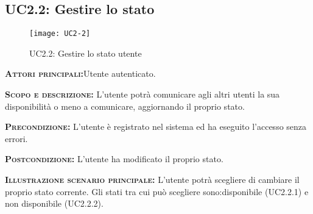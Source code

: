 \subsection{UC2.2: Gestire lo stato}
\begin{figure}[H]
\begin{center}
\texttt{[image: UC2-2]}
\caption{UC2.2: Gestire lo stato utente}\label{fig:gestione_stato}
\end{center}
\end{figure}
\begin{description}
\item{\scshape\bfseries Attori principali:}Utente autenticato.
\item{\scshape\bfseries Scopo e descrizione:} L'utente potrà comunicare agli altri utenti la sua disponibilità o meno a comunicare, aggiornando il proprio stato.
\item{\scshape\bfseries Precondizione:} L'utente è registrato nel sistema ed ha eseguito l'accesso senza errori.
\item{\scshape\bfseries Postcondizione:} L'utente ha modificato il proprio stato.
\item{\scshape\bfseries Illustrazione scenario principale:} L'utente potrà scegliere di cambiare il proprio stato corrente. Gli stati tra cui può scegliere sono:disponibile (UC2.2.1)  e non disponibile (UC2.2.2).
\end{description}

